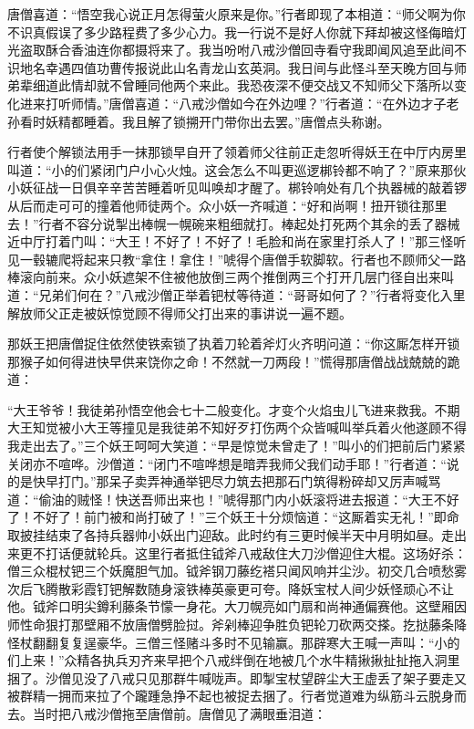 \documentclass[12pt,UTF8]{ctexbook}
\begin{document}
{	唐僧喜道：“悟空我心说正月怎得萤火原来是你。”行者即现了本相道：“师父啊为你不识真假误了多少路程费了多少心力。我一行说不是好人你就下拜却被这怪侮暗灯光盗取酥合香油连你都摄将来了。我当吩咐八戒沙僧回寺看守我即闻风追至此间不识地名幸遇四值功曹传报说此山名青龙山玄英洞。我日间与此怪斗至天晚方回与师弟辈细道此情却就不曾睡同他两个来此。我恐夜深不便交战又不知师父下落所以变化进来打听师情。”唐僧喜道：“八戒沙僧如今在外边哩？”行者道：“在外边才子老孙看时妖精都睡着。我且解了锁搠开门带你出去罢。”唐僧点头称谢。
	
	行者使个解锁法用手一抹那锁早自开了领着师父往前正走忽听得妖王在中厅内房里叫道：“小的们紧闭门户小心火烛。这会怎么不叫更巡逻梆铃都不响了？”原来那伙小妖征战一日俱辛辛苦苦睡着听见叫唤却才醒了。梆铃响处有几个执器械的敲着锣从后而走可可的撞着他师徒两个。众小妖一齐喊道：“好和尚啊！扭开锁往那里去！”行者不容分说掣出棒幌一幌碗来粗细就打。棒起处打死两个其余的丢了器械近中厅打着门叫：“大王！不好了！不好了！毛脸和尚在家里打杀人了！”那三怪听见一毂辘爬将起来只教“拿住！拿住！”唬得个唐僧手软脚软。行者也不顾师父一路棒滚向前来。众小妖遮架不住被他放倒三两个推倒两三个打开几层门径自出来叫道：“兄弟们何在？”八戒沙僧正举着钯杖等待道：“哥哥如何了？”行者将变化入里解放师父正走被妖惊觉顾不得师父打出来的事讲说一遍不题。
	
	那妖王把唐僧捉住依然使铁索锁了执着刀轮着斧灯火齐明问道：“你这厮怎样开锁那猴子如何得进快早供来饶你之命！不然就一刀两段！”慌得那唐僧战战兢兢的跪道：
	
	“大王爷爷！我徒弟孙悟空他会七十二般变化。才变个火焰虫儿飞进来救我。不期大王知觉被小大王等撞见是我徒弟不知好歹打伤两个众皆喊叫举兵着火他遂顾不得我走出去了。”三个妖王呵呵大笑道：“早是惊觉未曾走了！”叫小的们把前后门紧紧关闭亦不喧哗。沙僧道：“闭门不喧哗想是暗弄我师父我们动手耶！”行者道：“说的是快早打门。”那呆子卖弄神通举钯尽力筑去把那石门筑得粉碎却又厉声喊骂道：“偷油的贼怪！快送吾师出来也！”唬得那门内小妖滚将进去报道：“大王不好了！不好了！前门被和尚打破了！”三个妖王十分烦恼道：“这厮着实无礼！”即命取披挂结束了各持兵器帅小妖出门迎敌。此时约有三更时候半天中月明如昼。走出来更不打话便就轮兵。这里行者抵住钺斧八戒敌住大刀沙僧迎住大棍。这场好杀：僧三众棍杖钯三个妖魔胆气加。钺斧钢刀藤纥褡只闻风响并尘沙。初交几合喷愁雾次后飞腾散彩霞钉钯解数随身滚铁棒英豪更可夸。降妖宝杖人间少妖怪顽心不让他。钺斧口明尖鐏利藤条节懞一身花。大刀幌亮如门扇和尚神通偏赛他。这壁厢因师性命狠打那壁厢不放唐僧劈脸挝。斧剁棒迎争胜负钯轮刀砍两交搽。扢挞藤条降怪杖翻翻复复逞豪华。三僧三怪赌斗多时不见输赢。那辟寒大王喊一声叫：“小的们上来！”众精各执兵刃齐来早把个八戒绊倒在地被几个水牛精揪揪扯扯拖入洞里捆了。沙僧见没了八戒只见那群牛喊咙声。即掣宝杖望辟尘大王虚丢了架子要走又被群精一拥而来拉了个躘踵急挣不起也被捉去捆了。行者觉道难为纵筋斗云脱身而去。当时把八戒沙僧拖至唐僧前。唐僧见了满眼垂泪道：
	
}
\end{document}
